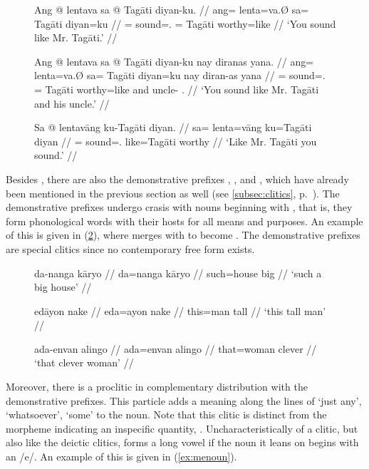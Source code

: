 \begin{figure}[h]
\pex\label{ex:kuposvar}
\a\begingl
	\gla Ang @ lentava sa @ Tagāti diyan-ku. //
	\glb ang= lenta=va.Ø sa= Tagāti diyan=ku //
	\glc \AgtT{}= sound=\Second{}.\Top{} \Parg{}= Tagāti worthy=like //
	\glft `You sound like Mr. Tagāti.' //
\endgl

\a\begingl
	\gla Ang @ lentava sa @ Tagāti diyan-ku nay diranas yana. //
	\glb ang= lenta=va.Ø sa= Tagāti diyan=ku nay diran-as yana //
	\glc \AgtT{}= sound=\Second{}.\Top{} \Parg{}= Tagāti worthy=like and 
		uncle-\Parg{} \TsgM{}.\Gen{} //
	\glft `You sound like Mr. Tagāti and his uncle.' //
\endgl

\a\begingl
	\gla Sa @ lentavāng ku-​Tagāti diyan. //
	\glb sa= lenta=vāng ku=​Tagāti diyan //
	\glc \PatT{}= sound=\Second{}.\Aarg{} like=​Tagāti worthy //
	\glft `Like Mr. Tagāti you sound.' //
\endgl
\xe
\end{figure}

Besides , there are also the demonstrative prefixes
, , and ,
which have already been mentioned in the previous section as well (see
\autoref{subsec:clitics}, p.~\pageref{clitics_prenoun_dem}). The demonstrative
prefixes undergo crasis with nouns beginning with , that is, they form
phonological words with their hosts for all means and purposes. An example of
this is given in (\ref{ex:noundemclit}), where  merges
with  to become . The
demonstrative prefixes are special clitics since no contemporary free form
exists.

\begin{figure}[h]
\pex\label{ex:noundemclit}
\a\begingl
	\gla da-nanga kāryo //
	\glb da=nanga kāryo //
	\glc such=house big //
	\glft `such a big house' //
\endgl

\a\begingl
	\gla edāyon nake //
	\glb eda=ayon nake //
	\glc this=man tall //
	\glft `this tall man' //
\endgl

\a\begingl
	\gla ada-envan alingo //
	\glb ada=envan alingo //
	\glc that=woman clever //
	\glft `that clever woman' //
\endgl
\xe
\end{figure}

Moreover, there is a proclitic  in complementary distribution
with the demonstrative prefixes. This particle adds a meaning along the lines
of `just any', `whatsoever', `some' to the noun. Note that this clitic is
distinct from the morpheme indicating an inspecific quantity,
. Uncharacteristically of a clitic, but also like the
deictic clitics,  forms a long vowel if the noun it leans on
begins with an /e/. An example of this is given in (\ref{ex:menoun}).

